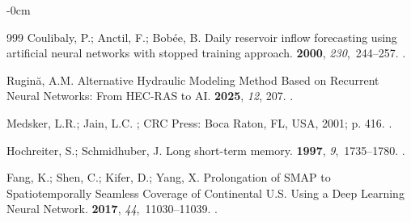 \documentclass[land,review,accept,pdftex,oneauthor]{Definitions/mdpi}
\begin{document}
\begin{adjustwidth}{-\extralength}{0cm}
\begin{thebibliography}{999}
Coulibaly, P.; Anctil, F.; Bob{\'e}e, B.
\newblock Daily reservoir inflow forecasting using artificial neural networks
  with stopped training approach.
 {\bf 2000}, {\em 230},~244--257.
.

Rugin{\u a}, A.M.
\newblock Alternative Hydraulic Modeling Method Based on Recurrent Neural
  Networks: From HEC-RAS to AI.
 {\bf 2025}, {\em 12}, 207.
.

Medsker, L.R.; Jain, L.C.
; CRC Press:  Boca Raton, FL, USA, %
  2001; p. 416.
.

Hochreiter, S.; Schmidhuber, J.
\newblock Long short-term memory. %
 {\bf 1997}, {\em 9},~1735--1780.
.

Fang, K.; Shen, C.; Kifer, D.; Yang, X.
\newblock Prolongation of SMAP to Spatiotemporally Seamless Coverage of
  Continental U.S. Using a Deep Learning Neural Network. %
 {\bf 2017}, {\em
  44},~11030--11039.
.


\end{thebibliography}
\end{adjustwidth}
\end{document}
